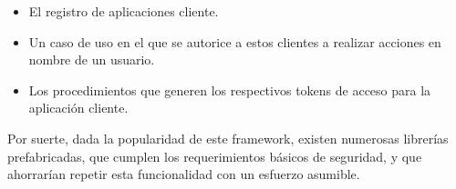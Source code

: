 \documentclass[main]{subfiles}
\begin{document}
\begin{itemize}
  \item El registro de aplicaciones cliente.
  \item Un caso de uso en el que se autorice a estos clientes a realizar acciones en nombre de un usuario.
  \item Los procedimientos que generen los respectivos \glspl{token} de acceso para la aplicación cliente.
\end{itemize}

Por suerte, dada la popularidad de este \gls{framework}, existen numerosas librerías prefabricadas, que cumplen los requerimientos básicos de seguridad, y que ahorrarían repetir esta funcionalidad con un esfuerzo asumible.
\end{document}
